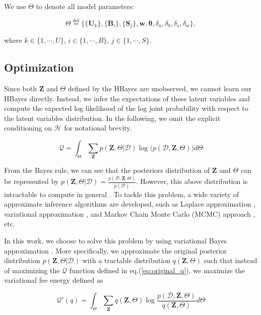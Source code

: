 We use $\Theta$ to denote all model parameters:

\begin{equation*}
\Theta \overset{\mathrm{def}}= \Big\{\{\bm{U}_k\}, \{\bm{B}_i\}, \{\bm{S}_j\}, \bm{w}, \boldsymbol{\theta}, \delta_u,\delta_b,\delta_s,\delta_w \Big\},
\end{equation*}

\noindent where $k \in \{1, \cdots, U\}$, $i \in \{1, \cdots, B\}$, $j \in \{1, \cdots, S\}$. 


\subsection{Optimization}

Since both $\mathbf{Z}$ and $\Theta$ defined by the HBayes are unobserved, we cannot learn our HBayes directly. Instead, we infer the expectations of these latent variables and compute the expected log likelihood of the log joint probability with respect to the latent variables distribution. In the following, we omit the explicit conditioning on $\mathcal{H}$ for notational brevity. 

\begin{equation}
\label{eq:original_q}
\mathcal{Q} = \int_\Theta \sum_{\bm{Z}} p(\bm{Z}, \Theta| \mathcal{D})  \log \big( p(\mathcal{D},\bm{Z},\Theta) \big) d\Theta
\end{equation}

From the Bayes rule, we can see that the posteriors distribution of $\mathbf{Z}$ and $\Theta$ can be represented by $p(\bm{Z},\Theta|\mathcal{D}) = \frac{p(\mathcal{D},\bm{Z},\Theta)}{p(\mathcal{D})}$. However, this above distribution is intractable to compute in general \cite{dickey1983multiple}. To tackle this problem, a wide variety of approximate inference algorithms are developed, such as Laplace approximation \cite{rue2009approximate}, variational approximation \cite{bishop2006pattern}, and Markov Chain Monte Carlo (MCMC) approach \cite{blei2003latent}, etc.

In this work, we choose to solve this problem by using variational Bayes approximation \cite{bishop2006pattern}. More specifically, we approximate the original posterior distribution $p(\bm{Z}, \Theta| \mathcal{D})$ with a tractable distribution $q(\bm{Z}, \Theta)$ such that instead of maximizing the $\mathcal{Q}$ function defined in eq.(\ref{eq:original_q}), we maximize the variational fee energy defined as 

\begin{equation}
\label{eq:original_variational_energy}
\mathcal{Q}'(q) = \int_\Theta \sum_{\bm{Z}} q(\bm{Z},\Theta) \log\frac{p(\mathcal{D},\bm{Z},\Theta)}{q(\bm{Z},\Theta)}d\Theta
\end{equation}

